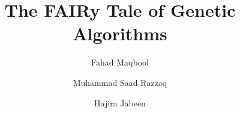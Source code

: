 \documentclass[preprint,12pt]{elsarticle}
\begin{document}
\begin{frontmatter}



\title{The FAIRy Tale of Genetic Algorithms}


\author[uos]{Fahad Maqbool}%
\address[uos]{University of Sargodha, Pakistan}
\author[uos]{Muhammad Saad Razzaq}
\author[gesis]{Hajira Jabeen}
\address[gesis]{GESIS-Leibniz Institute for the Social Sciences, Cologne, Germany}


\end{frontmatter}
\end{document}

